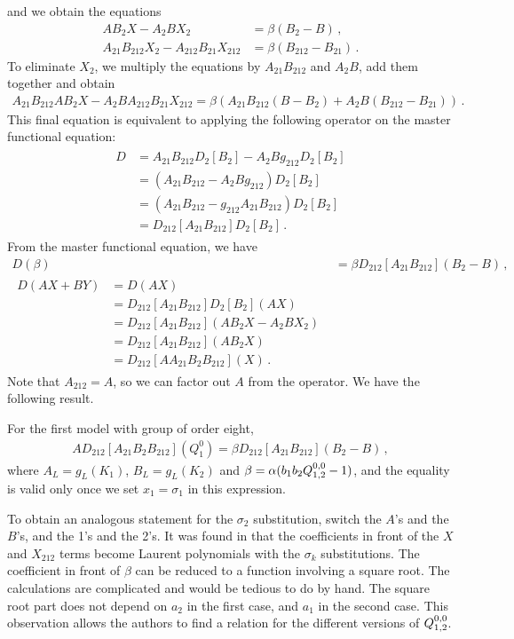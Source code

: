 and we obtain the equations
\begin{align}
	 AB_2 X - A_2 B X_2 &= \beta(B_2 - B)\,,\\
	  A_{21}B_{212} X_2 - A_{212} B_{21} X_{212} &= \beta(B_{212}-B_{21})\,.
\end{align}
To eliminate $X_2$, we multiply the equations by $A_{21}B_{212}$ and $A_2 B$, add them together and obtain
\begin{align}
	A_{21}B_{212}AB_2 X - A_2 BA_{212} B_{21} X_{212} = \beta(A_{21}B_{212}(B-B_2) + A_2 B(B_{212}-B_{21}))\,.
\end{align}
This final equation is equivalent to applying the following operator on the master functional equation:
\begin{align}
	\begin{split}
		D &=A_{21}B_{212} D_2[B_2] - A_2 B g_{212}D_2[B_2]\\
		   &= (A_{21}B_{212} - A_2 B g_{212})D_2[B_2]\\
		   &= (A_{21}B_{212} - g_{212}A_{21}B_{212})D_2[B_2]\\
		   &= D_{212}[A_{21}B_{212}]D_2[B_2]\,.
	\end{split}
\end{align}
From the master functional equation, we have
\begin{align}
	D(\beta) &= \beta D_{212}[A_{21}B_{212}](B_2-B)\,,\\
	\begin{split}
		 D(AX + BY) &= D(AX) \\
		&= D_{212}[A_{21}B_{212}]D_2[B_2](AX)\\
		&=D_{212}[A_{21}B_{212}](AB_2X - A_2BX_2)\\
		&=D_{212}[A_{21}B_{212}](AB_2X)\\
		&= D_{212}[AA_{21}B_2B_{212}](X)\,.
	\end{split}
\end{align}
Note that $A_{212} = A$, so we can factor out $A$ from the operator. We have the following result.
\begin{prop} For the first model with group of order eight,
\begin{align}
	AD_{212}[A_{21}B_2B_{212}]\left(Q_1^0\right) = \beta D_{212}[A_{21}B_{212}](B_2-B)\,,
\end{align}
where $A_L = g_L(K_1)$, $B_L = g_L(K_2)$ and $\beta = \alpha (b_1b_2Q_{1,2}^{0,0}-1)$, and the equality is valid only once we set $x_1 = \sigma_1$ in this expression.
\end{prop}
To obtain an analogous statement for the $\sigma_2$ substitution, switch the $A$'s and the $B$'s, and the 1's and the 2's. It was found in \cite{tabbara2014exact} that the coefficients in front of the $X$ and $X_{212}$ terms become Laurent polynomials with the $\sigma_k$ substitutions. The coefficient in front of $\beta$ can be reduced to a function involving a square root. The calculations are complicated and would be tedious to do by hand. The square root part does not depend on $a_2$ in the first case, and $a_1$ in the second case. This observation allows the authors to find a relation for the different versions of $Q_{1,2}^{0,0}$.

